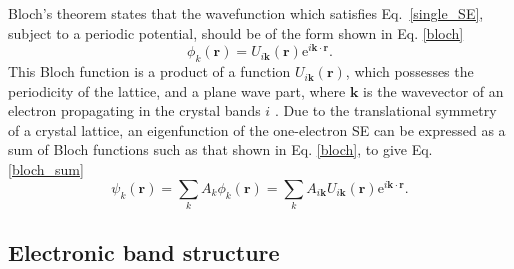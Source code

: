 \documentclass[11pt, twoside]{report}
\begin{document}
Bloch's theorem states that the wavefunction which satisfies Eq.~\ref{single_SE}, subject to a periodic potential, should be of the form shown in Eq. \ref{bloch}
\begin{equation} \label{bloch}
\phi_k(\boldsymbol{r}) = U_{i\boldsymbol{k}}(\boldsymbol{r}) \mathrm{e}^{i\boldsymbol{k \cdot r}} .
\end{equation}
This Bloch function is a product of a function $U_{i\boldsymbol{k}}(\boldsymbol{r})$, which possesses the periodicity of the lattice, and a plane wave part, where $\boldsymbol{k}$ is the wavevector of an electron propagating in the crystal bands $i$ \cite{Nelson3}.
Due to the translational symmetry of a crystal lattice, an eigenfunction of the one-electron SE can be expressed as a sum of Bloch functions such as that shown in Eq. \ref{bloch}, to give Eq. \ref{bloch_sum} 
\begin{equation} \label{bloch_sum}
\psi_k(\boldsymbol{r}) = \sum_k A_k \phi_k(\boldsymbol{r}) = \sum_k A_{i\boldsymbol{k}}U_{i\boldsymbol{k}}(\boldsymbol{r}) \mathrm{e}^{i\boldsymbol{k \cdot r}} .
\end{equation}



\subsection{Electronic band structure}
\end{document}
